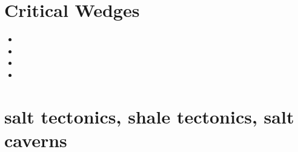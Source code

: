 \section{Critical Wedges}

\begin{small}
\begin{itemize}
\item[\nineteenninetyfour] 
\item[\twothousandsix] 
\item[\twothousandeight] 
\item[\twothousandthirteen] 
\end{itemize}
\end{small}

\section{salt tectonics, shale tectonics, salt caverns}

